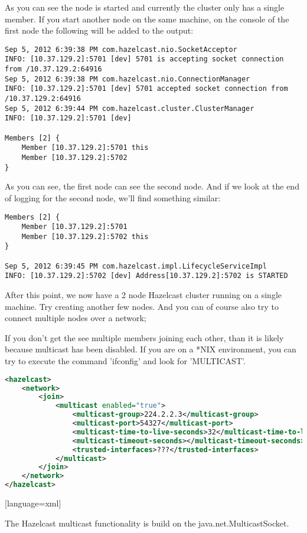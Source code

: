 As you can see the node is started and currently the cluster only has a single member. If you start another node on the same machine, on the console of the first node the following will be added to the output:
\begin{lstlisting}
Sep 5, 2012 6:39:38 PM com.hazelcast.nio.SocketAcceptor
INFO: [10.37.129.2]:5701 [dev] 5701 is accepting socket connection from /10.37.129.2:64916
Sep 5, 2012 6:39:38 PM com.hazelcast.nio.ConnectionManager
INFO: [10.37.129.2]:5701 [dev] 5701 accepted socket connection from /10.37.129.2:64916
Sep 5, 2012 6:39:44 PM com.hazelcast.cluster.ClusterManager
INFO: [10.37.129.2]:5701 [dev] 

Members [2] {
    Member [10.37.129.2]:5701 this
    Member [10.37.129.2]:5702
}
\end{lstlisting}	
As you can see, the first node can see the second node. And if we look at the end of logging for the second node, we'll find something similar:
\begin{lstlisting}
Members [2] {
    Member [10.37.129.2]:5701
    Member [10.37.129.2]:5702 this
}

Sep 5, 2012 6:39:45 PM com.hazelcast.impl.LifecycleServiceImpl
INFO: [10.37.129.2]:5702 [dev] Address[10.37.129.2]:5702 is STARTED
\end{lstlisting}		

After this point, we now have a 2 node Hazelcast cluster running on a single machine. Try creating another few nodes. And you can of course also try to connect multiple nodes over a network;

If you don't get the see multiple members joining each other, than it is likely because multicast has been disabled. If you are on a *NIX environment, you can try to execute the command 'ifconfig' and look for 'MULTICAST'. 

\begin{lstlisting}[language=xml]
<hazelcast>
    <network>
        <join>
            <multicast enabled="true">
                <multicast-group>224.2.2.3</multicast-group>
                <multicast-port>54327</multicast-port>
                <multicast-time-to-live-seconds>32</multicast-time-to-live-seconds>
                <multicast-timeout-seconds></multicast-timeout-seconds>
                <trusted-interfaces>???</trusted-interfaces>
            </multicast>
        </join>
    </network>
</hazelcast>
\end{lstlisting}[language=xml]

The Hazelcast multicast functionality is build on the java.net.MulticastSocket.

